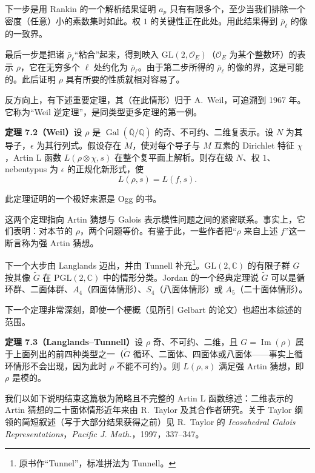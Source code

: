 下一步是用 Rankin 的一个解析结果证明 $a_p$ 只有有限多个，至少当我们排除一个密度（任意）小的素数集时如此。权 $1$ 的关键性正在此处。用此结果得到 $\bar\rho_\ell$ 的像的一致界。

最后一步是把诸 $\bar\rho_\ell$“粘合”起来，得到映入 $\mathrm{GL}(2,\mathcal{O}_E)$（$\mathcal{O}_E$ 为某个整数环）的表示 $\rho$，它在无穷多个 $\ell$ 处约化为 $\bar\rho_\ell$。由于第二步所得的 $\bar\rho_\ell$ 的像的界，这是可能的。此后证明 $\rho$ 具有所要的性质就相对容易了。

反方向上，有下述重要定理，其（在此情形）归于 A.~Weil，可追溯到 1967 年。它称为“Weil 逆定理”，是同类型更多定理的第一例。

\par\medskip\noindent\textbf{定理 7.2（Weil）}\quad 设 $\rho$ 是 $\operatorname{Gal}(\overline{\mathbb{Q}}/\mathbb{Q})$ 的奇、不可约、二维复表示。设 $N$ 为其导子，$\epsilon$ 为其行列式。假设存在 $M$，使对每个导子与 $M$ 互素的 Dirichlet 特征 $\chi$，Artin L 函数 $L(\rho\otimes\chi,s)$ 在整个复平面上解析。则存在级 $N$、权 $1$、nebentypus 为 $\epsilon$ 的正规化新形式，使
\begin{equation}\tag{7.3}\label{c4:eq:7.3}
L(\rho,s)=L(f,s).
\end{equation}

此定理证明的一个极好来源是 Ogg 的书。

这两个定理指向 Artin 猜想与 Galois 表示模性问题之间的紧密联系。事实上，它们表明：对本节的 $\rho$，两个问题等价。有鉴于此，一些作者把“$\rho$ 来自上述 $f$”这一断言称为强 Artin 猜想。

下一个大步由 Langlands 迈出，并由 Tunnell 补充\footnote{原书作“Tunnel”，标准拼法为 Tunnell。}。$\mathrm{GL}(2,\mathbb{C})$ 的有限子群 $G$ 按其像 $\tilde G$ 在 $\mathrm{PGL}(2,\mathbb{C})$ 中的情形分类。Jordan 的一个经典定理说 $\tilde G$ 可以是循环群、二面体群、$A_4$（四面体情形）、$S_4$（八面体情形）或 $A_5$（二十面体情形）。

下一个定理非常深刻，即使一个梗概（见所引 Gelbart 的论文）也超出本综述的范围。

\par\medskip\noindent\textbf{定理 7.3（Langlands--Tunnell）}\quad 设 $\rho$ 奇、不可约、二维，且 $G=\operatorname{Im}(\rho)$ 属于上面列出的前四种类型之一（$\tilde G$ 循环、二面体、四面体或八面体——事实上循环情形不会出现，因为此时 $\rho$ 不能不可约）。则 $L(\rho,s)$ 满足强 Artin 猜想，即 $\rho$ 是模的。

我们以如下说明结束这篇极为简略且不完整的 Artin L 函数综述：二维表示的 Artin 猜想的二十面体情形近年来由 R.~Taylor 及其合作者研究。关于 Taylor 纲领的简短叙述（写于大部分结果获得之前）见 R.~Taylor 的 \emph{Icosahedral Galois Representations}，\emph{Pacific J. Math.}，1997，337--347。

